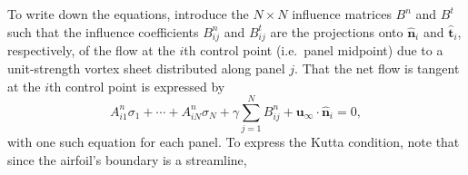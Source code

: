 \documentclass[10pt]{article}
\def\ie{i.e.~}
\begin{document}

To write down the equations, introduce the $N\times N$ influence matrices $B^n$ and $B^t$ such that the influence coefficients $B_{ij}^n$ and $B_{ij}^t$ are the projections onto $\hat{\mathbf n}_i$ and $\hat{\mathbf t}_i$, respectively, of the flow at the $i$th control point (\ie panel midpoint) due to a unit-strength vortex sheet distributed along panel $j$.  That the net flow is tangent at the $i$th control point is expressed by \[A_{i1}^n\sigma_1+\cdots+A_{iN}^n\sigma_N+\gamma\sum_{j=1}^NB_{ij}^n + \mathbf u_\infty\cdot\hat{\mathbf n}_i = 0,\] with one such equation for each panel.  To express the Kutta condition, note that since the airfoil's boundary is a streamline, 
\end{document}
